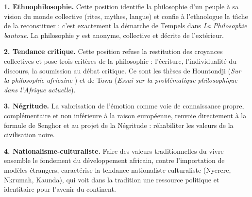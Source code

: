 \documentclass[11pt]{article}
\begin{document}
\begin{corrige}

\textbf{1. Ethnophilosophie.} Cette position identifie la philosophie d'un peuple à sa vision du monde collective (rites, mythes, langue) et confie à l'ethnologue la tâche de la reconstituer : c'est exactement la démarche de Tempels dans \emph{La Philosophie bantoue}. La philosophie y est anonyme, collective et décrite de l'extérieur.

\textbf{2. Tendance critique.} Cette position refuse la restitution des croyances collectives et pose trois critères de la philosophie : l'écriture, l'individualité du discours, la soumission au débat critique. Ce sont les thèses de Hountondji (\emph{Sur la \guillemotleft philosophie africaine \guillemotright}) et de Towa (\emph{Essai sur la problématique philosophique dans l'Afrique actuelle}).

\textbf{3. Négritude.} La valorisation de l'émotion comme voie de connaissance propre, complémentaire et non inférieure à la raison européenne, renvoie directement à la formule de Senghor et au projet de la Négritude : réhabiliter les valeurs de la civilisation noire.

\textbf{4. Nationalisme-culturaliste.} Faire des valeurs traditionnelles du vivre-ensemble le fondement du développement africain, contre l'importation de modèles étrangers, caractérise la tendance nationaliste-culturaliste (Nyerere, Nkrumah, Kaunda), qui voit dans la tradition une ressource politique et identitaire pour l'avenir du continent.

\end{corrige}
\end{document}
